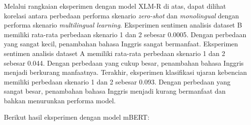 \begin{enumerate}
        \end{enumerate}
        
        Melalui rangkaian eksperimen dengan model XLM-R di atas, dapat dilihat korelasi antara perbedaan performa skenario \textit{zero-shot} dan \textit{monolingual} dengan performa skenario \textit{multilingual learning}. Eksperimen sentimen analisis dataset B memiliki rata-rata perbedaan skenario 1 dan 2 sebesar 0.0005. Dengan perbedaan yang sangat kecil, penambahan bahasa Inggris sangat bermanfaat. Eksperimen sentimen analisis dataset A memiliki rata-rata perbedaan skenario 1 dan 2 sebesar 0.044. Dengan perbedaan yang cukup besar, penambahan bahasa Inggris menjadi berkurang manfaatnya. Terakhir, eksperimen klasifikasi ujaran kebencian memiliki perbedaan skenario 1 dan 2 sebesar 0.093. Dengan perbedaan yang sangat besar, penambahan bahasa Inggris menjadi kurang bermanfaat dan bahkan menurunkan performa model.

        Berikut hasil eksperimen dengan model mBERT: 

